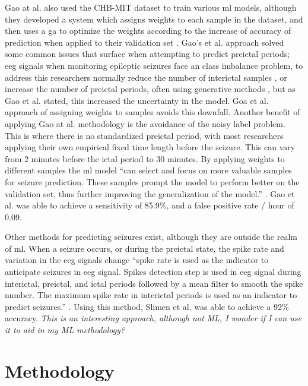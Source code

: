 \documentclass[12pt]{article}
\begin{document}
Gao at al. also used the CHB-MIT dataset to train various \acrshort{ml} models, although they developed a system which assigns weights to each sample in the dataset, and then uses a \acrfull{ga} to optimize the weights according to the increase of accuracy of prediction when applied to their validation set \cite{gao2022general}. Gao's et al. approach solved some common issues that surface when attempting to predict preictal periods; \acrshort{eeg} signals when monitoring epileptic seizures face an class imbalance problem, to address this researchers normally reduce the number of interictal samples \cite{ozcan2019seizure}, or increase the number of preictal periods, often using generative methods \cite{usman2021deep}, but as Gao et al. stated, this increased the uncertainty in the model. Goa et al. approach of assigning weights to samples avoids this downfall. Another benefit of applying Gao at al. methodology is the avoidance of the noisy label problem. This is where there is no standardized preictal period, with most researchers applying their own empirical fixed time length before the seizure. This can vary from 2 minutes before the ictal period to 30 minutes. By applying weights to different samples the \acrshort{ml} model ``can select and focus on more valuable samples for seizure prediction. These samples prompt the model to perform better on the validation set, thus further improving the generalization of the model.'' \cite{gao2022general}. Gao et al. was able to achieve a sensitivity of 85.9\%, and a false positive rate / hour of 0.09. 


Other methods for predicting seizures exist, although they are outside the realm of \acrshort{ml}. When a seizure occurs, or during the preictal state, the spike rate and variation in the \acrshort{eeg} signals change \cite{lange1983temporo} \cite{truccolo2011single} ``spike rate is used as the indicator to anticipate seizures in \acrfull{eeg} signal. Spikes detection step is used in \acrshort{eeg} signal during interictal, preictal, and ictal periods followed by a mean filter to smooth the spike number. The maximum spike rate in interictal periods is used as an indicator to predict seizures.'' \cite{slimen2020epileptic}. Using this method, Slimen et al. was able to achieve a 92\% accuracy. \textit{This is an interesting approach, although not ML, I wonder if I can use it to aid in my ML methodology?}


\section{Methodology}
\end{document}
